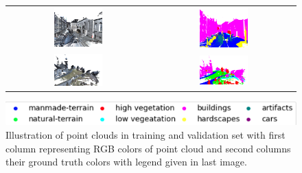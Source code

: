 \begin{figure}
\begin{tabular}{cc}
        \includegraphics[width=0.35\textwidth, height=0.15\textheight]{images/sem3d_data/4.png} & \includegraphics[width=0.35\textwidth, height=0.15\textheight]{images/sem3d_data/4_gt.png}\\
        \includegraphics[width=0.35\textwidth, height=0.15\textheight]{images/sem3d_data/5.png} & \includegraphics[width=0.35\textwidth, height=0.15\textheight]{images/sem3d_data/5_gt.png}\\
    \end{tabular}
    \includegraphics[scale=0.65]{images/legend.png}
    \caption{Illustration of point clouds in training and validation set with first column representing RGB colors of point cloud and second columns their ground truth colors with legend given in last image.}
\end{figure}
\newpage

